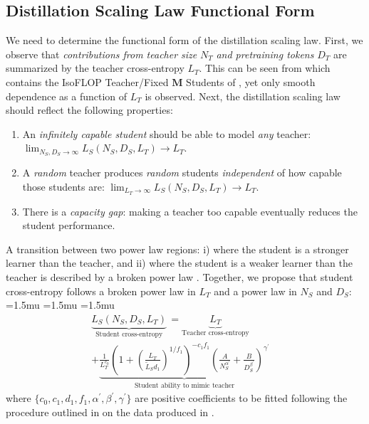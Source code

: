 \subsection{Distillation Scaling Law Functional Form}
\label{ssec:distillation-scaling-law-functional-form}
We need to determine the functional form of the distillation scaling law.
First, we observe that \emph{contributions from teacher size} $N_T$ \emph{and pretraining tokens} $D_T$ are summarized by the teacher cross-entropy $L_T$.
This can be seen from  which contains the
IsoFLOP Teacher/Fixed $\bm M$ Students of , yet only smooth dependence as a function of $L_T$ is observed.
Next, the distillation scaling law should reflect the following properties:
\begin{enumerate}
    \item An \emph{infinitely capable student} should be able to model \emph{any} teacher: $\lim_{N_S,D_S\to\infty}L_S(N_S,D_S,L_T)\rightarrow L_T$.
    \item A \emph{random} teacher produces \emph{random} students \emph{independent} of how capable those students are: $\lim_{L_T\to\infty}L_S(N_S,D_S,L_T)\rightarrow L_T$.
    \item There is a \emph{capacity gap}: making a teacher too capable eventually reduces the student performance.
\end{enumerate}
A transition between two power law regions: i) where the student is a stronger learner than the teacher, and ii) where the student is a weaker learner than the teacher is described by a broken power law \citep{DBLP:conf/iclr/CaballeroGRK23}.
Together, we propose that student cross-entropy follows a broken power law in $L_T$ and a power law in $N_S$ and $D_S$:{
		\medmuskip=1.5mu
		\thinmuskip=1.5mu
		\thickmuskip=1.5mu
		\begin{align}
			\underbrace{L_S(N_S,D_S,L_T)}_{\text{Student cross-entropy}}\,
			=\underbrace{L_T}_{\text{Teacher cross-entropy}} \qquad \quad\nonumber \\+
			\underbrace{\frac1{L_T^{c_0}}
			\left(1+\left(\frac{L_T}{\widetilde{L}_S d_1}\right)^{1/{f_1}}\right)^{-c_1f_1}
			\left(\frac{A}{N_S^{\alpha^\prime}}+\frac{B}{D_S^{\beta^\prime}}\right)^{\gamma^\prime}}_{\text{Student ability to mimic teacher}}
			\label{eq:distillation-scaling-law}
		\end{align}
	}where $\{c_0,c_1,d_1,f_1,\alpha^\prime,\beta^\prime,\gamma^\prime\}$ are positive coefficients to be fitted following the procedure outlined in  on the data produced in .
